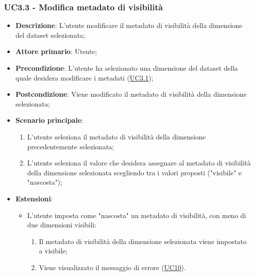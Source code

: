 \subsubsection{UC3.3 - Modifica metadato di visibilità}
\label{ssub:uc3.3}

\begin{itemize}
    \item \textbf{Descrizione}: L’utente modificare il metadato di visibilità della dimensione del dataset selezionata;
	
    \item \textbf{Attore primario}: Utente;
    
    \item \textbf{Precondizione}:   L'utente ha selezionato una dimensione del dataset della quale desidera modificare 
    i metadati (\hyperref[ssub:uc3.1]{UC3.1});

    \item \textbf{Postcondizione}:  Viene modificato il metadato di visibilità della dimensione selezionata;

    \item \textbf{Scenario principale}: 
    \begin{enumerate}
        \item L'utente seleziona il metadato di visibilità della dimensione precedentemente selezionata;
        \item L'utente seleziona il valore che desidera assegnare al metadato di visibilità della dimensione 
        selezionata scegliendo tra i valori proposti ("visibile" e "nascosta");
    \end{enumerate}
    
    \item \textbf{Estensioni}:
    \begin{itemize}
        \item L'utente imposta come "nascosta" un metadato di visibilità, con meno di due dimensioni visibili:
        \begin{enumerate}
            \item Il metadato di visibilità della dimensione selezionata viene impostato a 
            visibile;
            \item Viene visualizzato il messaggio di errore (\hyperref[sub:uc10]{UC10}).
        \end{enumerate}
    \end{itemize}
\end{itemize}